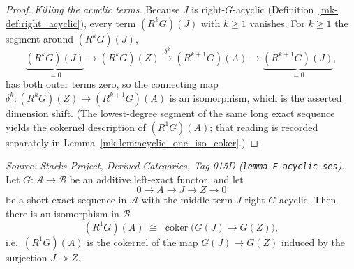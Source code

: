 \begin{proof}
  \emph{Killing the acyclic terms.} Because \(J\) is right-\(G\)-acyclic
  (Definition~\ref{mk-def:right_acyclic}), every term \((R^k G)(J)\) with \(k \geq 1\)
  vanishes. For \(k \geq 1\) the segment around \((R^k G)(J)\),
  \[
    \underbrace{(R^{k} G)(J)}_{=0} \to (R^{k} G)(Z)
      \xrightarrow{\ \delta^k\ } (R^{k+1} G)(A) \to \underbrace{(R^{k+1} G)(J)}_{=0},
  \]
  has both outer terms zero, so the connecting map
  \(\delta^k : (R^{k} G)(Z) \to (R^{k+1} G)(A)\) is an isomorphism, which is the
  asserted dimension shift. (The lowest-degree segment of the same long exact
  sequence yields the cokernel description of \((R^1 G)(A)\); that reading is
  recorded separately in Lemma~\ref{mk-lem:acyclic_one_iso_coker}.)
\end{proof}

\begin{lemma}\label{mk-lem:acyclic_one_iso_coker}
  \leanok

  \textit{Source: Stacks Project, Derived Categories, Tag 015D
  (\texttt{lemma-F-acyclic-ses}).}
  Let \(G : \mathcal{A} \to \mathcal{B}\) be an additive left-exact functor, and let
  \[
    0 \longrightarrow A \longrightarrow J \longrightarrow Z \longrightarrow 0
  \]
  be a short exact sequence in \(\mathcal{A}\) with the middle term \(J\)
  right-\(G\)-acyclic. Then there is an isomorphism in \(\mathcal{B}\)
  \[
    (R^{1} G)(A) \;\cong\; \operatorname{coker}\bigl(G(J) \to G(Z)\bigr),
  \]
  i.e.\ \((R^1 G)(A)\) is the cokernel of the map \(G(J) \to G(Z)\) induced by the
  surjection \(J \twoheadrightarrow Z\).
\end{lemma}

